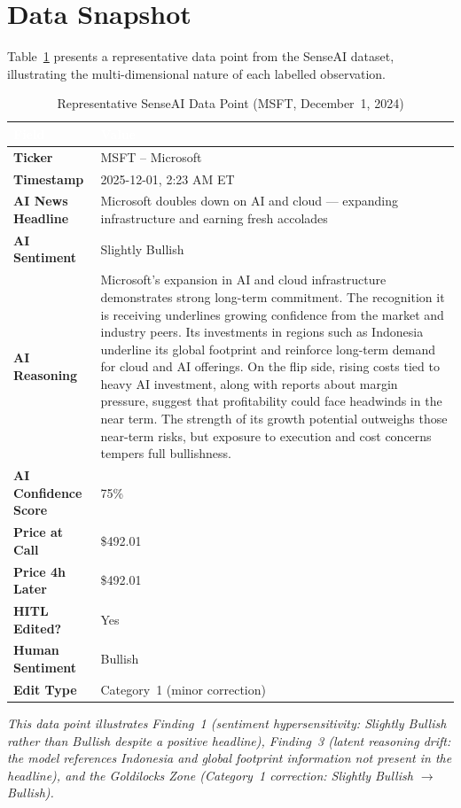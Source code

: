 \documentclass[11pt,a4paper]{article}
\begin{document}
\appendix

\section{Data Snapshot}
\label{app:snapshot}

Table~\ref{tab:data_snapshot} presents a representative data point from the SenseAI
dataset, illustrating the multi-dimensional nature of each labelled observation.

\begin{table}[H]
\centering
\caption{Representative SenseAI Data Point (MSFT, December~1, 2024)}
\label{tab:data_snapshot}
\renewcommand{\arraystretch}{1.45}
\begin{tabularx}{\textwidth}{>{\bfseries\color{darkblue}}p{3.2cm} X}
\toprule
\rowcolor{headerblue}
\textcolor{white}{\textbf{Field}} & \textcolor{white}{\textbf{Value}} \\
\midrule
Ticker & MSFT -- Microsoft \\
\rowcolor{rowgray}
Timestamp & 2025-12-01, 2:23 AM ET \\
AI News Headline &
  Microsoft doubles down on AI and cloud ---
  expanding infrastructure and earning fresh accolades \\
\rowcolor{rowgray}
AI Sentiment & Slightly Bullish \\
AI Reasoning &
  Microsoft's expansion in AI and cloud infrastructure demonstrates strong
  long-term commitment. The recognition it is receiving underlines growing
  confidence from the market and industry peers. Its investments in regions
  such as Indonesia underline its global footprint and reinforce long-term
  demand for cloud and AI offerings. On the flip side, rising costs tied to
  heavy AI investment, along with reports about margin pressure, suggest
  that profitability could face headwinds in the near term. The strength of
  its growth potential outweighs those near-term risks, but exposure to
  execution and cost concerns tempers full bullishness. \\
\rowcolor{rowgray}
AI Confidence Score & 75\% \\
Price at Call & \$492.01 \\
\rowcolor{rowgray}
Price 4h Later & \$492.01 \\
HITL Edited? & Yes \\
\rowcolor{rowgray}
Human Sentiment & Bullish \\
Edit Type & Category~1 (minor correction) \\
\bottomrule
\end{tabularx}
\vspace{6pt}
\small\textit{This data point illustrates Finding~1 (sentiment hypersensitivity: Slightly
Bullish rather than Bullish despite a positive headline), Finding~3 (latent reasoning
drift: the model references Indonesia and global footprint information not present in
the headline), and the Goldilocks Zone (Category~1 correction: Slightly Bullish
$\to$ Bullish).}
\end{table}
\end{document}

